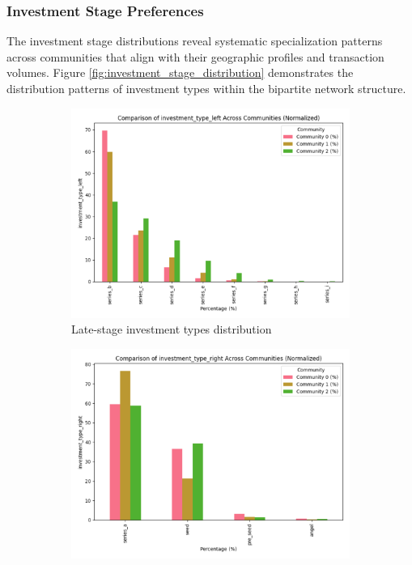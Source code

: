 
\subsubsection{Investment Stage Preferences}

The investment stage distributions reveal systematic specialization patterns across communities that align with their geographic profiles and transaction volumes. Figure \ref{fig:investment_stage_distribution} demonstrates the distribution patterns of investment types within the bipartite network structure.

\begin{figure}[htbp]
\centering
\begin{subfigure}{0.5\textwidth}
    \centering
    \includegraphics[width=\textwidth]{./assets/late-investment-types-distribution.png}
    \caption{Late-stage investment types distribution}
    \label{fig:late_stage_types}
\end{subfigure}
\hfill
\begin{subfigure}{0.5\textwidth}
    \centering
    \includegraphics[width=\textwidth]{./assets/early-investment-types-distribution.png}

\end{subfigure}
\end{figure}
